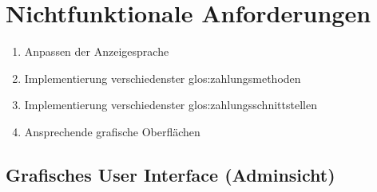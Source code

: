 \documentclass{lastenheft}
\begin{document}
\section{Nichtfunktionale Anforderungen}

\begin{enumerate}[font={\bfseries},label={NFRQ\arabic*:}]
    \item Anpassen der Anzeigesprache
    \item Implementierung verschiedenster \gls{glos:zahlungsmethode}n
    \item Implementierung verschiedenster \gls{glos:zahlungsschnittstelle}n
    \item Ansprechende grafische Oberflächen
\end{enumerate}

\subsection{Grafisches User Interface (Adminsicht)}
%


\clearpage

\printnoidxglossaries

\clearpage
%
\end{document}
